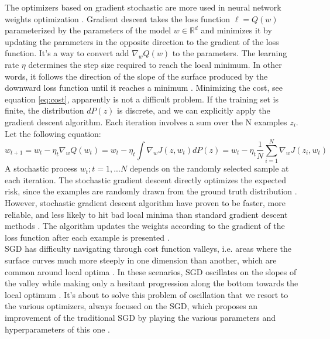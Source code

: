 \documentclass[lnbip]{svmultln}
\begin{document}
	The optimizers based on gradient stochastic are more used in neural network weights optimization \cite[]{ruder2016overview}.
	Gradient descent takes the loss function $\ell = Q(w)$ parameterized by the parameters of the model $w \in \mathbb{R}^d$ and minimizes it by updating the parameters in the opposite direction to the gradient of the loss function. It's a way to convert add $\nabla_w Q(w)$ to the parameters. The learning rate $\eta$ determines the step size required to reach the local minimum. In other words, it follows the direction of the slope of the surface produced by the downward loss function until it reaches a minimum \cite[]{bottou1991stochastic, ruder2016overview}. Minimizing the cost, see equation \ref{eq:cost}, apparently is not a difficult problem. If the training set is finite, the distribution $dP(z)$ is discrete, and we can explicitly apply the gradient descent algorithm. Each iteration involves a sum over the N examples $z_i$. Let the following equation:
	\begin{equation}
	w_{t+1}   = w_t - \eta_t {\nabla_w Q(w_t)} 
	 = w_t - \eta_t \int \nabla_w J(z,w_t) dP(z) 
	 = w_t - \eta_t \frac{1}{N} \sum_{i=1}^{N}  \nabla_w J(z_i,w_t)	
	\label{eq:descent_gradient}
	\end{equation}
	A stochastic process ${w_t; t=1,...N}$ depends on the randomly selected sample at each iteration.
	The stochastic gradient descent directly optimizes the expected risk, since the examples are randomly drawn from the ground truth distribution \cite[]{bottou2010large}.
	However, stochastic gradient descent algorithm have proven to be faster, more reliable, and less likely to hit bad local minima than standard gradient descent methods \cite[]{wijnhoven2010fast}. The algorithm updates the weights according to the gradient of the loss function after each example is presented \cite[]{bottou1991stochastic}.\\
	
	SGD has difficulty navigating through cost function valleys, i.e. areas where the surface curves much more steeply in one dimension than another, which are common around local optima \cite[]{antoine2018apprentissage}. In these scenarios, SGD oscillates on the slopes of the valley while making only a hesitant progression along the bottom towards the local optimum \cite[]{ruder2016overview,bottou1991stochastic}.
	It's about to solve this problem of oscillation that we resort to the various optimizers, always focused on the SGD, which proposes an improvement of the traditional SGD by playing the various parameters and hyperparameters of this one \cite[]{lin2019nesterov,ruder2016overview}.
	
\end{document}
